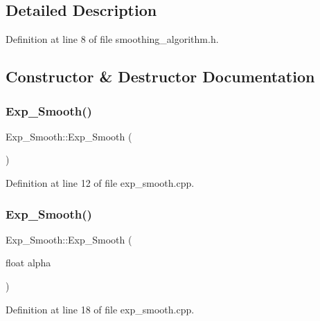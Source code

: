 \subsection{Detailed Description}


Definition at line 8 of file smoothing\+\_\+algorithm.\+h.



\subsection{Constructor \& Destructor Documentation}
\mbox{\label{class_exp___smooth_a51fa3033647299932db14d5b14f5e7e1}} 
\subsubsection{\texorpdfstring{Exp\_Smooth()}{Exp\_Smooth()}\hspace{0.1cm}{\footnotesize\ttfamily [1/4]}}
{\footnotesize\ttfamily Exp\+\_\+\+Smooth\+::\+Exp\+\_\+\+Smooth (\begin{DoxyParamCaption}{ }\end{DoxyParamCaption})}



Definition at line 12 of file exp\+\_\+smooth.\+cpp.

\mbox{\label{class_exp___smooth_a06681bf09505f9a271fc541cad30d562}} 
\subsubsection{\texorpdfstring{Exp\_Smooth()}{Exp\_Smooth()}\hspace{0.1cm}{\footnotesize\ttfamily [2/4]}}
{\footnotesize\ttfamily Exp\+\_\+\+Smooth\+::\+Exp\+\_\+\+Smooth (\begin{DoxyParamCaption}\item[{float}]{alpha }\end{DoxyParamCaption})}



Definition at line 18 of file exp\+\_\+smooth.\+cpp.

\mbox{\label{class_exp___smooth_a3dc9204af30caecd3a7c298f3b392b18}} 
